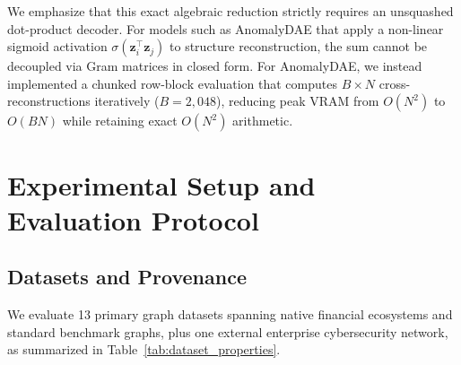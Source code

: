 \documentclass[applsci,article,submit,moreauthors,pdftex]{Definitions/mdpi}
\begin{document}
We emphasize that this exact algebraic reduction strictly requires an unsquashed dot-product decoder. For models such as AnomalyDAE that apply a non-linear sigmoid activation $\sigma(\mathbf{z}_i^\top \mathbf{z}_j)$ to structure reconstruction, the sum cannot be decoupled via Gram matrices in closed form. For AnomalyDAE, we instead implemented a chunked row-block evaluation that computes $B \times N$ cross-reconstructions iteratively ($B=2,048$), reducing peak VRAM from $O(N^2)$ to $O(B N)$ while retaining exact $O(N^2)$ arithmetic.

\section{Experimental Setup and Evaluation Protocol}
\label{sec:experimental_setup}

\subsection{Datasets and Provenance}
We evaluate 13 primary graph datasets spanning native financial ecosystems and standard benchmark graphs, plus one external enterprise cybersecurity network, as summarized in Table~\ref{tab:dataset_properties}.
\end{document}
